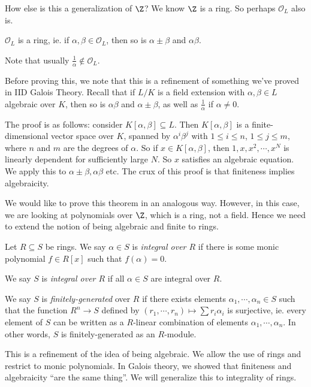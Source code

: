 \documentclass[a4paper]{article}
\begin{document}
How else is this a generalization of $\Z$? We know $\Z$ is a ring. So perhaps $\mathcal{O}_L$ also is.

\begin{thm}
  $\mathcal{O}_L$ is a ring, ie. if $\alpha, \beta \in \mathcal{O}_L$, then so is $\alpha \pm \beta$ and $\alpha\beta$.
\end{thm}
Note that usually $\frac{1}{\alpha} \not \in \mathcal{O}_L$.

Before proving this, we note that this is a refinement of something we've proved in IID Galois Theory. Recall that if $L/K$ is a field extension with $\alpha, \beta \in L$ algebraic over $K$, then so is $\alpha\beta$ and $\alpha \pm \beta$, as well as $\frac{1}{\alpha}$ if $\alpha \not= 0$.

The proof is as follows: consider $K[\alpha, \beta] \subseteq L$. Then $K[\alpha, \beta]$ is a finite-dimensional vector space over $K$, spanned by $\alpha^i \beta^j$ with $1 \leq i \leq n$, $1 \leq j \leq m$, where $n$ and $m$ are the degrees of $\alpha$. So if $x \in K[\alpha, \beta]$, then $1, x, x^2, \cdots, x^N$ is linearly dependent for sufficiently large $N$. So $x$ satisfies an algebraic equation. We apply this to $\alpha \pm \beta, \alpha\beta$ etc. The crux of this proof is that finiteness implies algebraicity.

We would like to prove this theorem in an analogous way. However, in this case, we are looking at polynomials over $\Z$, which is a ring, not a field. Hence we need to extend the notion of being algebraic and finite to rings.

\begin{defi}[Integrality]
  Let $R \subseteq S$ be rings. We say $\alpha \in S$ is \emph{integral over $R$} if there is some monic polynomial $f \in R[x]$ such that $f(\alpha) = 0$.

  We say $S$ is \emph{integral over $R$} if all $\alpha \in S$ are integral over $R$.

  We say $S$ is \emph{finitely-generated} over $R$ if there exists elements $\alpha_1, \cdots, \alpha_n \in S$ such that the function $R^n \to S$ defined by $(r_1, \cdots, r_n) \mapsto \sum r_i \alpha_i$ is surjective, ie. every element of $S$ can be written as a $R$-linear combination of elements $\alpha_1, \cdots, \alpha_n$. In other words, $S$ is finitely-generated as an $R$-module.
\end{defi}
This is a refinement of the idea of being algebraic. We allow the use of rings and restrict to monic polynomials. In Galois theory, we showed that finiteness and algebraicity ``are the same thing''. We will generalize this to integrality of rings.
\end{document}
